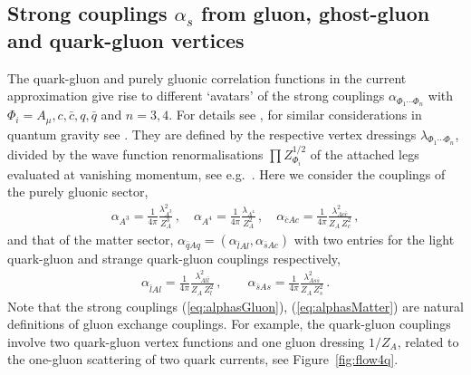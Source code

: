 \documentclass[%
reprint,
superscriptaddress,
showpacs,preprintnumbers,
 amsmath,amssymb,
 aps,
prd,
]{revtex4-1}
\def\Fig#1{Figure~\ref{#1}}
\def\eq#1{(\ref{#1})}
\begin{document}
\subsection{Strong couplings $\alpha_s$ from gluon, ghost-gluon and
  quark-gluon vertices}\label{sec:StrCoup}
The quark-gluon and purely gluonic correlation functions in the
current approximation give rise to different `avatars' of the strong
couplings $\alpha_{\Phi_1\cdots \Phi_n}$ with
$\Phi_i=A_\mu, c,\bar c, q,\bar q$ and $n=3,4$. For details see \cite{
  Mitter:2014wpa,Cyrol:2016tym,Cyrol:2017ewj,Cyrol:2017qkl}, for
similar considerations in quantum gravity see
\cite{Eichhorn:2018akn,Eichhorn:2018ydy}. They are defined by the
respective vertex dressings $\lambda_{\Phi_1\cdots\Phi_n}$, divided by
the wave function renormalisations $\prod Z_{\Phi_i}^{1/2}$ of the
attached legs evaluated at vanishing momentum, see e.g.\
\cite{Cyrol:2017ewj}. Here we consider the couplings of the purely
gluonic sector,
%
\begin{align}\label{eq:alphasGluon}
  \alpha_{A^3} = \frac{1}{4\pi} \frac{\lambda_{A^3}^2}{Z_A^{3}}\,,
  \quad \alpha_{A^4} =
  \frac{1}{4\pi}  \frac{\lambda_{A^4}}{Z_A^{2}}\,,\quad
  \alpha_{\bar c Ac} = \frac{1}{4\pi} \frac{
  \lambda_{A c \bar c}^2}{Z_A\,Z_c^2 }\,,
\end{align}
%  
and that of the matter sector,
$\alpha_{\bar q A q}=(\alpha_{ \bar lAl } ,\alpha_{ \bar s Ac})$ with
two entries for the light quark-gluon and strange quark-gluon
couplings respectively,
%
\begin{align}\label{eq:alphasMatter}
  \alpha^{\ }_{\bar l A l} = \frac{1}{4\pi}
  \frac{\lambda_{ A l \bar l }^2}{Z_A\,Z_l^2 }\,, \qquad
  \alpha_{\bar s A s} = \frac{1}{4\pi}
  \frac{\lambda_{A s \bar s }^2}{Z_A\,Z_s^2 }\,.
\end{align}
%
Note that the strong couplings \eq{eq:alphasGluon},
\eq{eq:alphasMatter} are natural definitions of gluon exchange
couplings. For example, the quark-gluon couplings involve two
quark-gluon vertex functions and one gluon dressing $1/Z_A$, related
to the one-gluon scattering of two quark currents, see
\Fig{fig:flow4q}.
\end{document}
